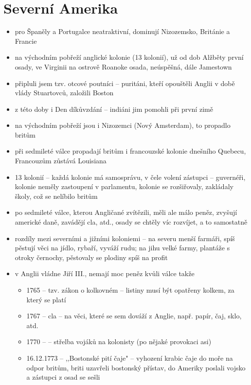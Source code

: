 \documentclass{article}
\begin{document}
\part{Severní Amerika}
\begin{itemize}
  \item pro Španěly a Portugalce neatraktivní, dominují Nizozemsko, Británie a Francie
  \item na východním pobřeží anglické kolonie (13 kolonií), už od dob Alžběty první osady, ve Virginii na ostrově Roanoke osada, neúspěšná, dále Jamestown
  \item připluli jsem tzv. otcové poutníci -- puritáni, kteří opouštěli Anglii v době vlády Stuartovců, založili Boston
  \item z této doby i Den díkůvzdání -- indiáni jim pomohli při první zimě
  \item na východním pobřeží jsou i Nizozemci (Nový Amsterdam), to propadlo britům
  \item při sedmileté válce propadají britům i francouzské kolonie dnešního Quebecu, Francouzům zůstává Louisiana
  \item 13 kolonií -- každá kolonie má samosprávu, v čele volení zástupci -- guvernéři, kolonie neměly zastoupení v parlamentu, kolonie se rozšiřovaly, zakládaly školy, což se nelíbilo britům
  \item po sedmileté válce, kterou Angličané zvítězili, měli ale málo peněz, zvyšují americké daně, zavádějí cla, atd., osady se chtěly víc rozvíjet, a to samostatně
  \item rozdíly mezi severními a jižními koloniemi -- na severu menší farmáři, spíš pěstují věci na jídlo, rybaří, vyváží rudu; na jihu velké farmy, plantáže s otroky černochy, pěstovaly se plodiny spíš na profit
  \item v Anglii vládne Jiří III., nemají moc peněz kvůli válce takže
  \begin{itemize}
    \item 1765 -- tzv. zákon o kolkovném -- listiny musí být opatřeny kolkem, za který se platí
    \item 1767 -- cla -- na věci, které se sem dováží z Anglie, např. papír, čaj, sklo, atd.
    \item 1770 --  -- střelba vojáků na kolonisty (po nějaké provokaci asi)
    \item 16.12.1773 -- ,,Bostonské pití čaje" -- vyhození krabic čaje do moře na odpor britům, briti uzavřeli bostonský přístav, do Ameriky poslali vojsko a zástupci z osad se sešli

\end{itemize}
\end{itemize}
\end{document}
